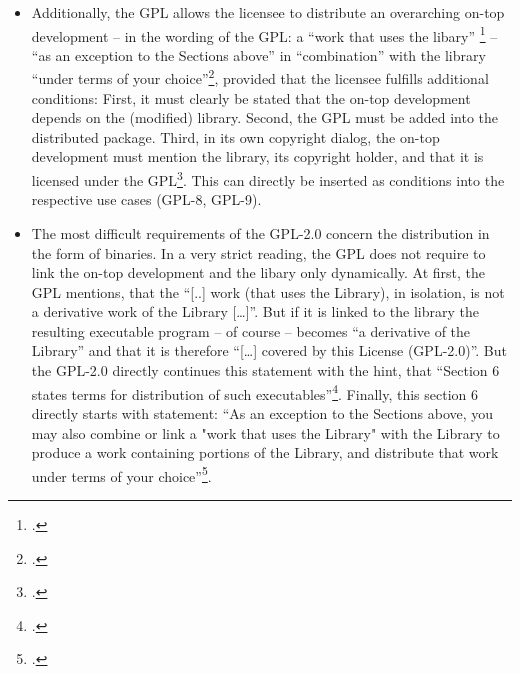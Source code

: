 \begin{itemize}
\begin{itemize}
    \item Third, the GPL definitely requires, that \enquote{the modified work
    must itself be a software library}\footcite[cf.][\nopage wp.\
    §2]{Gpl20OsiLicense1991a}. This conditions can directly be incorprated as
    an interdiction into all use cases which refer to the modification of a
    library [GPL-6 - GPL-9]. But is difficult to respect the condition if one
    wants to modify a program which one has received under the terms of the
    GPL-2.0. Logically, you can write an application und license it under the
    GPL. But - as a consequence - it is more difficult to modify your work
    because the result must be a library. That's the reason, why the OSLiC
    mentions the use case, but forbids its execution\footnote{as long as nobody
    has shown us an exit out of this trap.}.
  \end{itemize}
  
  \item Additionally, the GPL allows the licensee to distribute an overarching
  on-top development -- in the wording of the GPL: a \enquote{work that uses
  the libary} \footcite[cf.][\nopage wp.\ §5, §6]{Gpl20OsiLicense1991a} --
  \enquote{as an exception to the Sections above} in \enquote{combination} with
  the library \enquote{under terms of your choice}\footcite[cf.][\nopage wp.\
  §6]{Gpl20OsiLicense1991a}, provided that the licensee fulfills additional
  conditions:  First, it must clearly be stated that the on-top development
  depends on the (modified) library. Second, the GPL must be added into the
  distributed package. Third, in its own copyright dialog, the on-top
  development must mention the library, its copyright holder, and that it is
  licensed under the GPL\footcite[cf.][\nopage wp.\ §6]{Gpl20OsiLicense1991a}.
  This can directly be inserted as conditions into the respective use cases
  (GPL-8, GPL-9). 
  
  \item The most difficult requirements of the GPL-2.0 concern the distribution
  in the form of binaries. In a very strict reading, the GPL does not require
  to link the on-top development and the libary only dynamically. At first, the
  GPL mentions, that the \enquote{[..] work (that uses the Library), in
  isolation, is not a derivative work of the Library [\ldots]}. But if it is
  linked to the library the resulting executable program -- of course -- becomes
  \enquote{a derivative of the Library} and that it is therefore
  \enquote{[\ldots] covered by this License (GPL-2.0)}. But the GPL-2.0
  directly continues this statement with the hint, that \enquote{Section 6
  states terms for distribution of such executables}\footcite[cf.][\nopage wp.\
  §5]{Gpl20OsiLicense1991a}. Finally, this section 6 directly starts with
  statement: \enquote{As an exception to the Sections above, you may also
  combine or link a "work that uses the Library" with the Library to produce a
  work containing portions of the Library, and distribute that work under terms
  of your choice}\footcite[cf.][\nopage wp.\ §6]{Gpl20OsiLicense1991a}.
  

\end{itemize}
